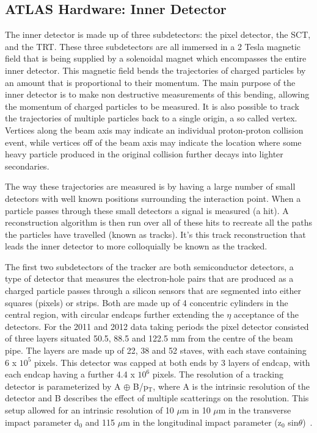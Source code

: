\subsection{ATLAS Hardware: Inner Detector}
\label{Sec.ID}
The inner detector is made up of three subdetectors: the pixel detector, the \gls{SCT}, and the \gls{TRT}.  
These three subdetectors are all immersed in a 2 Tesla magnetic field that is being supplied by a solenoidal magnet which encompasses the entire inner detector.  
This magnetic field bends the trajectories of charged particles by an amount that is proportional to their momentum.  
The main purpose of the inner detector is to make non destructive measurements of this bending, allowing the momentum of charged particles to be measured.  
It is also possible to track the trajectories of multiple particles back to a single origin, a so called vertex.  
Vertices along the beam axis may indicate an individual proton-proton collision event, while vertices off of the beam axis may indicate the location where some heavy particle produced in the original collision further decays into lighter secondaries.  
 
The way these trajectories are measured is by having a large number of small detectors with well known positions surrounding the interaction point.  
When a particle passes through these small detectors a signal is measured (a hit).  
A reconstruction algorithm is then run over all of these hits to recreate all the paths the particles have travelled (known as tracks).  
It's this track reconstruction that leads the inner detector to more colloquially be known as the tracked.  

The first two subdetectors of the tracker are both semiconductor detectors, a type of detector that measures the electron-hole pairs that are produced as a charged particle passes through a silicon sensors that are segmented into either squares (pixels) or strips.  
Both are made up of 4 concentric cylinders in the central region, with circular endcaps further extending the $\eta$ acceptance of the detectors.  
For the 2011 and 2012 data taking periods the pixel detector consisted of three layers situated 50.5, 88.5 and 122.5 mm from the centre of the beam pipe.  
The layers are made up of 22, 38 and 52 staves, with each stave containing 6 x $10^5$ pixels.  
This detector was capped at both ends by 3 layers of endcap, with each endcap having a further 4.4 x $10^6$ pixels.  
The resolution of a tracking detector is parameterized by A $\oplus$ B/p$_{\mathrm{T}}$, where A is the intrinsic resolution of the detector and B describes the effect of multiple scatterings on the resolution.  
This setup allowed for an intrinsic resolution of 10 $\mu$m in 10 $\mu$m in the transverse impact parameter d$_{0}$ and 115 $\mu$m in the longitudinal impact parameter (z$_{0}$ sin$\theta$)~\cite{ID3}.  

